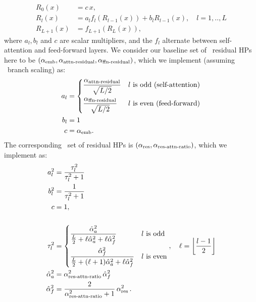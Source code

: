 \begin{align} \label{eq:final_full_residual_eq}
    R_0(x) &= c\,x,
    \\
    R_{l}(x) &= a_{l}f_l(R_{l-1}(x)) + b_lR_{l-1}(x), \quad l=1,..,L
    \\
    R_{L+1}(x) &= f_{L+1}(R_L(x)),
\end{align}
where $a_l, b_l$ and $c$ are scalar multipliers, and the $f_l$ alternate between self-attention and feed-forward layers. We consider our baseline set of \mup\ residual HPs here to be $(\alpha_{\mathrm{emb}}, \alpha_{\mathrm{attn{\text -}residual}}, \alpha_{\mathrm{ffn{\text -}residual}})$, which we implement (assuming \depthmup\ branch scaling) as:
\begin{align*}
    a_l &= \begin{dcases}
        \frac{\alpha_{\mathrm{attn{\text -}residual}}}{\sqrt{L/2}} & l \textrm{ is odd (self-attention)}
        \\
        \frac{\alpha_{\mathrm{ffn{\text -}residual}}}{\sqrt{L/2}} & l \textrm{ is even (feed-forward)}
    \end{dcases}
    \\
    b_l &= 1
    \\
    c &= \alpha_{\mathrm{emb}}.
\end{align*}
The corresponding \umup\ set of residual HPs is $(\alpha_{\mathrm{res}}, \alpha_{\mathrm{res{\text -}attn{\text -}ratio}})$, which we implement as:
\begin{align} \label{eq:final_full_residual_multipliers}
    a^2_l &= \frac{\tau^2_l}{\tau^2_l + 1}
    \\
    b^2_l &= \frac{1}{\tau^2_l + 1}
    \\
    c &= 1, \\
    \\
    \tau^2_l &= \begin{dcases}
        \frac{\hat{\alpha}^2_a}{\frac{L}{2} + \ell \hat{\alpha}^2_a + \ell \hat{\alpha}^2_f} & l \textrm{ is odd}
        \\
        \frac{\hat{\alpha}^2_f}{\frac{L}{2} + (\ell + 1) \hat{\alpha}^2_a + \ell \hat{\alpha}^2_f} & l \textrm{ is even}
    \end{dcases}, \quad \ell = \left\lfloor{\frac{l-1}{2}}\right\rfloor
    \\
    \hat{\alpha}^2_a &= \alpha^2_{\mathrm{res{\text -}attn{\text -}ratio}}\,\hat{\alpha}^2_f\
    \\
    \hat{\alpha}^2_f &= \frac{2}{\alpha_{\mathrm{res{\text -}attn{\text -}ratio}}^2 + 1}\,\alpha^2_{\mathrm{res}}\,.
\end{align}
